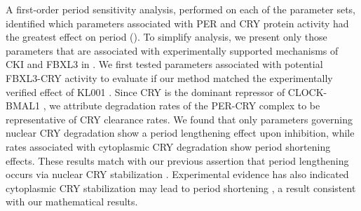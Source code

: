 A first-order period sensitivity analysis, performed on each of the parameter sets, identified which parameters associated with PER and CRY protein activity had the greatest effect on period (). 
To simplify analysis, we present only those parameters that are associated with experimentally supported mechanisms of CKI and FBXL3 in . 
We first tested parameters associated with potential FBXL3-CRY activity to evaluate if our method matched the experimentally verified effect of KL001 \cite{Hirota2012}. 
Since CRY is the dominant repressor of CLOCK-BMAL1 \cite{Ye2011}, we attribute degradation rates of the PER-CRY complex to be representative of CRY clearance rates. 
We found that only parameters governing nuclear CRY degradation show a period lengthening effect upon inhibition, while rates associated with cytoplasmic CRY degradation show period shortening effects. 
These results match with our previous assertion that period lengthening occurs via nuclear CRY stabilization \cite{Hirota2012}. 
Experimental evidence has also indicated cytoplasmic CRY stabilization may lead to period shortening \cite{Kurabayashi2010}, a result consistent with our mathematical results.

